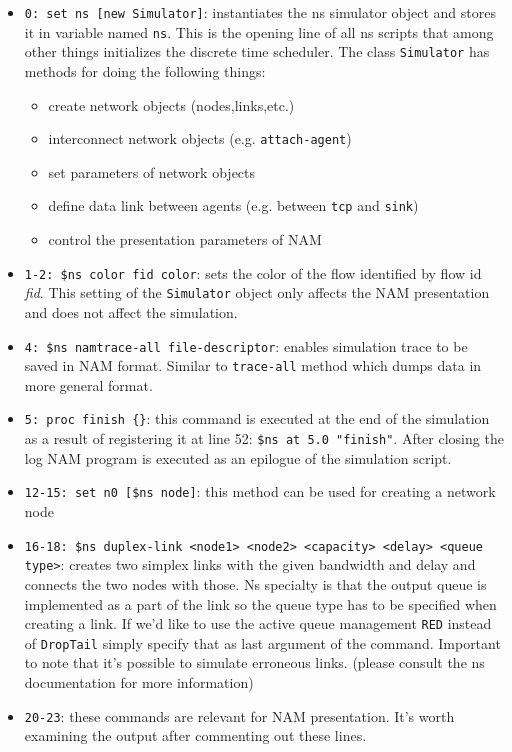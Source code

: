 \documentclass[a4paper]{article}
\begin{document}
\begin{itemize}

\item \verb!0: set ns [new Simulator]!: instantiates the ns simulator object and stores it in variable named \verb!ns!. This is the opening line of all ns scripts that among other things initializes the discrete time scheduler. The class \verb!Simulator! has methods for doing the following things:

\begin{itemize}
    \item create network objects (nodes,links,etc.)
    \item interconnect network objects (e.g. \verb!attach-agent!)
    \item set parameters of network objects
    \item define data link between agents (e.g. between \verb!tcp! and \verb!sink!)
    \item control the presentation parameters of NAM
\end{itemize}   


\item \verb!1-2: $ns color fid color!: sets the color of the flow identified by flow id \emph{fid}. This setting of the \verb!Simulator! object only affects the NAM presentation and does not affect the simulation.

\item \verb!4: $ns namtrace-all file-descriptor!: enables simulation trace to be saved in NAM format. Similar to \verb!trace-all! method which dumps data in more general format.

\item \verb!5: proc finish {}!: this command is executed at the end of the simulation as a result of registering it at line 52: \verb!$ns at 5.0 "finish"!. After closing the log NAM program is executed as an epilogue of the simulation script.

\item \verb!12-15: set n0 [$ns node]!: this method can be used for creating a network node

\item \verb!16-18: $ns duplex-link <node1> <node2> <capacity> <delay> <queue type>!: creates two simplex links with the given bandwidth and delay and connects the two nodes with those. Ns specialty is that the output queue is implemented as a part of the link so the queue type has to be specified when creating a link. If we'd like to use the active queue management \verb!RED! instead of \verb!DropTail! simply specify that as last argument of the command. Important to note that it's possible to simulate erroneous links. (please consult the ns documentation for more information)

\item \verb!20-23!: these commands are relevant for NAM presentation. It's worth examining the output after commenting out these lines.

\end{itemize}
\end{document}
